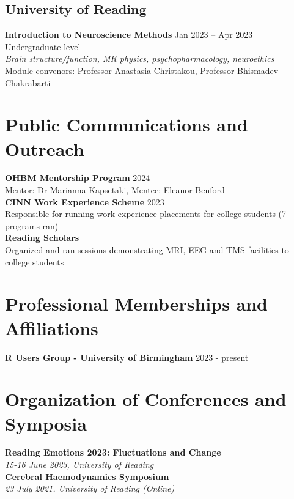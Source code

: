 \documentclass[10pt, a4paper]{article}
\begin{document}
\subsection*{University of Reading}
\textbf{Introduction to Neuroscience Methods} \hfill Jan 2023 -- Apr 2023 \\
Undergraduate level \\
\textit{Brain structure/function, MR physics, psychopharmacology, neuroethics} \\
Module convenors: Professor Anastasia Christakou, Professor Bhismadev Chakrabarti  \\

\section*{Public Communications and Outreach}
\textbf{OHBM Mentorship Program}  \hfill 2024 \\
Mentor: Dr Marianna Kapsetaki, Mentee: Eleanor Benford \\

\textbf{CINN Work Experience Scheme}  \hfill 2023 \\
Responsible for running work experience placements for college students (7 programs ran) \\

\textbf{Reading Scholars} \\
Organized and ran sessions demonstrating MRI, EEG and TMS facilities to college students \\

\section*{Professional Memberships and Affiliations}
\textbf{R Users Group - University of Birmingham}  \hfill 2023 - present \\

\section*{Organization of Conferences and Symposia}
\textbf{Reading Emotions 2023: Fluctuations and Change}  \\
\textit{15-16 June 2023, University of Reading} \\

\textbf{Cerebral Haemodynamics Symposium}  \\
\textit{23 July 2021, University of Reading (Online)} \\
\end{document}
